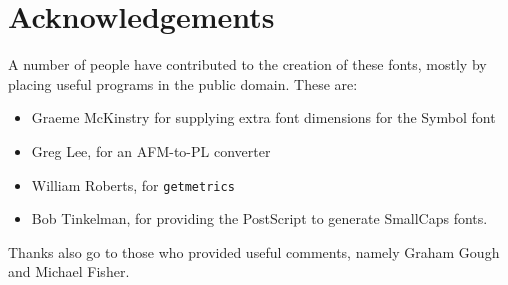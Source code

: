 \section{Acknowledgements}

A number of people have contributed to the creation of these fonts,
mostly by placing useful programs in the public domain.  These are:
\begin{itemize}
\item	Graeme McKinstry for supplying extra font dimensions for the
	Symbol font
\item	Greg Lee, for an AFM-to-PL converter
\item	William Roberts, for {\tt getmetrics}
\item	Bob Tinkelman, for providing the PostScript to generate
	SmallCaps fonts.
\end{itemize}
Thanks also go to those who provided useful comments, namely Graham
Gough and Michael Fisher.


